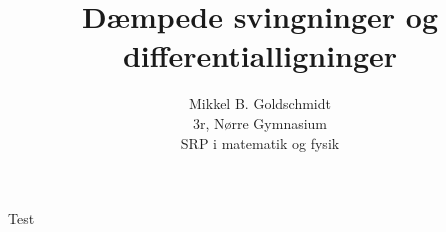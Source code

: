 \documentclass[11pt,a4paper]{book}
\author{Mikkel B. Goldschmidt \\ 3r, Nørre Gymnasium \\ SRP i matematik og fysik}
\title{Dæmpede svingninger og differentialligninger}
\begin{document}
\maketitle

Test\cite{FysikA}


\printbibliography
\end{document}

